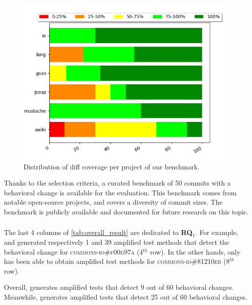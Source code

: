 \begin{figure}
\centering
\includegraphics[width=.95\linewidth]{img/diff_cov_hist.png}
\caption{Distribution of diff coverage per project of our benchmark.}
\label{fig:histdiffcoverage}
\end{figure}

Thanks to the selection criteria, 
a curated benchmark of 50 commits with a behavioral change is available for the evaluation.
This benchmark comes from notable open-source projects, and covers a diversity of commit sizes. 
The benchmark is publicly available and documented for future research on this topic.

\subsubsection{\rqdetection}
\label{subsubsec:dci:evaluation:rq1}

The last 4 columns of \autoref{tab:overall_result} are dedicated to \textbf{RQ$_1$}.
For example, \DCIA and \DCII generated respectively 1 and 39 amplified test methods that detect the behavioral change for \textsc{commons-io\#f00d97a} (4$^{th}$ row).
In the other hands, only \DCII has been able to obtain amplified test methods for \textsc{commons-io\#81210eb} (8$^{th}$ row).

Overall, \DCIA generates amplified tests that detect 9 out of 60 behavioral changes.
Meanwhile, \DCII generates amplified tests that detect 25 out of 60 behavioral changes.


